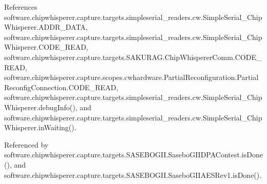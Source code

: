 References software.\+chipwhisperer.\+capture.\+targets.\+simpleserial\+\_\+readers.\+cw.\+Simple\+Serial\+\_\+\+Chip\+Whisperer.\+A\+D\+D\+R\+\_\+\+D\+A\+T\+A, software.\+chipwhisperer.\+capture.\+targets.\+simpleserial\+\_\+readers.\+cw.\+Simple\+Serial\+\_\+\+Chip\+Whisperer.\+C\+O\+D\+E\+\_\+\+R\+E\+A\+D, software.\+chipwhisperer.\+capture.\+targets.\+S\+A\+K\+U\+R\+A\+G.\+Chip\+Whisperer\+Comm.\+C\+O\+D\+E\+\_\+\+R\+E\+A\+D, software.\+chipwhisperer.\+capture.\+scopes.\+cwhardware.\+Partial\+Reconfiguration.\+Partial\+Reconfig\+Connection.\+C\+O\+D\+E\+\_\+\+R\+E\+A\+D, software.\+chipwhisperer.\+capture.\+targets.\+simpleserial\+\_\+readers.\+cw.\+Simple\+Serial\+\_\+\+Chip\+Whisperer.\+debug\+Info(), and software.\+chipwhisperer.\+capture.\+targets.\+simpleserial\+\_\+readers.\+cw.\+Simple\+Serial\+\_\+\+Chip\+Whisperer.\+in\+Waiting().



Referenced by software.\+chipwhisperer.\+capture.\+targets.\+S\+A\+S\+E\+B\+O\+G\+I\+I.\+Sasebo\+G\+I\+I\+D\+P\+A\+Contest.\+is\+Done(), and software.\+chipwhisperer.\+capture.\+targets.\+S\+A\+S\+E\+B\+O\+G\+I\+I.\+Sasebo\+G\+I\+I\+A\+E\+S\+Rev1.\+is\+Done().


